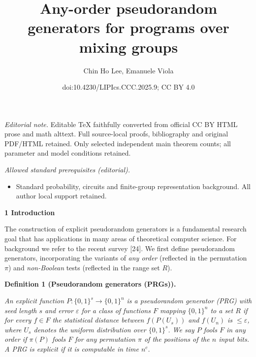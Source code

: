 \documentclass[10pt,a4paper]{article}
\title{Any-order pseudorandom generators for programs over mixing groups}
\author{Chin Ho Lee, Emanuele Viola}
\date{doi:10.4230/LIPIcs.CCC.2025.9; CC BY 4.0}
\begin{document}
\maketitle
\noindent\textit{Editorial note.} Editable TeX faithfully converted from official CC BY HTML prose and math alttext. Full source-local proofs, bibliography and original PDF/HTML retained. Only selected independent main theorem counts; all parameter and model conditions retained.\par\medskip
\noindent\textit{Allowed standard prerequisites (editorial).}\begin{itemize}
\item Standard probability, circuits and finite-group representation background. All author local support retained.
\end{itemize}\medskip


\par\medskip\noindent\textbf{
1 Introduction}\par




The construction of explicit pseudorandom generators is a fundamental research
goal that has applications in many areas of theoretical computer science.
For background we refer to the recent survey [24].
We first define pseudorandom generators, incorporating the variants
of \emph{any order} (reflected in the permutation $\pi$) and \emph{non-Boolean} tests (reflected in the
range set $R$).\par





\par\medskip\noindent\textbf{
\textbf{Definition 1}\textbf{ }(Pseudorandom generators (PRGs))\textbf{.}
}\par



\emph{An explicit function $P\colon\{0,1\}^{s}\to\{0,1\}^{n}$ is a pseudorandom
generator (PRG) with seed length $s$ and error $\varepsilon$ for a class
of functions $F$ mapping $\{0,1\}^{n}$ to a set $R$ if for every $f\in F$ the
statistical distance between $f(P(U_{s}))$ and $f(U_{n})$ is $\leq\varepsilon$,
where $U_{s}$ denotes the uniform distribution over $\{0,1\}^{s}$. We say $P$ fools $F$ in any order if $\pi(P)$ fools $F$
for any permutation $\pi$ of the positions of the $n$ input bits.
A PRG is explicit if it is computable in time $n^{c}$.}\par
\end{document}
